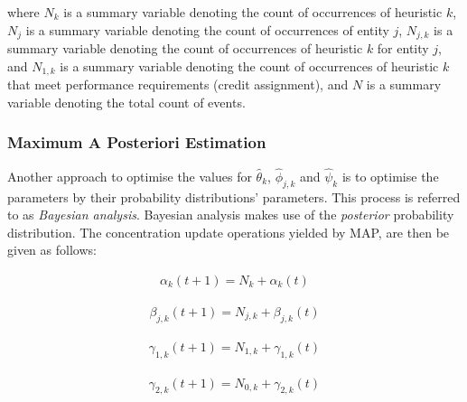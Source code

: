 where $N_{k}$ is a summary variable denoting the count of occurrences of heuristic $k$, $N_{j}$ is a summary variable denoting the count of occurrences of entity $j$, $N_{j,k}$ is a summary variable denoting the count of occurrences of heuristic $k$ for entity $j$, and $N_{1,k}$ is a summary variable denoting the count of occurrences of heuristic $k$ that meet performance requirements (credit assignment), and $N$ is a summary variable denoting the total count of events.

\subsubsection{Maximum A Posteriori Estimation}\label{sec:bhh:optimisation_step:map}

Another approach to optimise the values for $\hat{\theta}_{k}$, $\hat{\phi}_{j,k}$ and $\hat{\psi}_{k}$ is to optimise the parameters by their probability distributions' parameters. This process is referred to as \textit{Bayesian analysis}. Bayesian analysis makes use of the \textit{posterior} probability distribution. The concentration update operations yielded by \acs{MAP}, are then be given as follows:

\begin{equation}
	\label{eq:bhh:optimisation_step:map:alpha_update_operation}
	\begin{split}
		\alpha_{k}(t+1) = N_{k} + \alpha_{k}(t)
	\end{split}
\end{equation}

\begin{equation}
	\label{eq:bhh:optimisation_step:map:beta_update_operation}
	\begin{split}
		\beta_{j,k}(t+1) = N_{j,k} + \beta_{j,k}(t)
	\end{split}
\end{equation}

\begin{equation}
	\label{eq:bhh:optimisation_step:map:gamma1_update_operation}
	\begin{split}
		\gamma_{1,k}(t+1) = N_{1,k} + \gamma_{1,k}(t)
	\end{split}
\end{equation}

\begin{equation}
	\label{eq:bhh:optimisation_step:map:gamma2_update_operation}
	\begin{split}
		\gamma_{2,k}(t+1) = N_{0,k} + \gamma_{2,k}(t)
	\end{split}
\end{equation}

